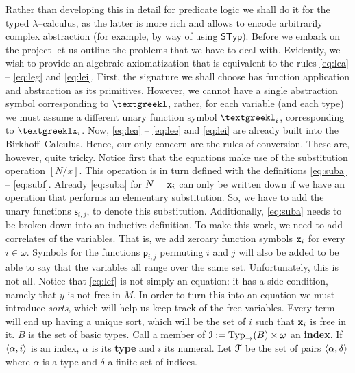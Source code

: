 Rather than developing this in detail for predicate logic we shall
do it for the typed $\lambda$--calculus, as the latter is more rich 
and allows to encode arbitrarily complex abstraction (for example, by
way of using $\mathsf{STyp}$). Before we embark on the project let us 
outline the problems that we have to deal with. Evidently, we wish 
to provide an algebraic axiomatization that is equivalent to the 
rules \eqref{eq:lea} -- \eqref{eq:leg} and \eqref{eq:lei}. First, 
the signature we shall choose has function application and abstraction 
as its primitives. However, we cannot have a single abstraction 
symbol corresponding to $\tlambda$, rather, for each variable 
(and each type) we must assume a different unary function symbol 
$\tlambda_i$, corresponding to $\tlambda \mbox{\tt x}_i$. Now, 
\eqref{eq:lea} -- \eqref{eq:lee} and \eqref{eq:lei} are already 
built into the Birkhoff--Calculus. Hence, our only concern are the 
rules of conversion. These are, however, quite 
tricky. Notice first that the equations make use of the substitution 
operation $[N/x]$. This operation is in turn defined with the 
definitions \eqref{eq:suba} -- \eqref{eq:subf}. Already \eqref{eq:suba}
for $N = \mbox{\tt x}_i$ can only be written down if we have an operation 
that performs an elementary substitution. So, we have to add the unary 
functions $\mathsf{s}_{i,j}$, to denote this substitution. Additionally, 
\eqref{eq:suba} needs to be broken down into an inductive definition.
To make this work, we need to add correlates of the variables. 
That is, we add zeroary function symbols $\mbox{\tt x}_i$ for 
every $i \in \omega$. Symbols for the functions $\mathsf{p}_{i,j}$ permuting 
$i$ and $j$ will also be added to be able to say that the variables 
all range over the same set. Unfortunately, this is not all. Notice 
that \eqref{eq:lef} is not simply an equation: it has a side condition, 
namely that $y$ is not free in $M$. In order to turn this into an 
equation we must introduce {\it sorts}, which will help us keep track 
of the free variables. Every term will end up having a unique sort, 
which will be the set of $i$ such that $\mbox{\tt x}_i$ is free in 
it. $B$ is the set of basic types. Call a member of 
$\mathcal{I} := \operatorname{Typ}_{\rightarrow}(B) \times \omega$ an \textbf{index}. 
If $\langle \alpha, i\rangle$ is an index, $\alpha$ is its \textbf{type} 
and $i$ its numeral. Let $\mathcal{F}$ be the set of pairs 
$\langle \alpha, \delta\rangle$ where $\alpha$ is a type and $\delta$ 
a finite set of indices.

